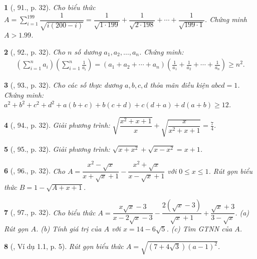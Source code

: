 \documentclass{article}
\newtheorem{baitoan}{}
\begin{document}
\begin{baitoan}[\cite{Tuyen_Toan_9_old}, 91., p. 32]
	Cho biểu thức $A = \sum_{i=1}^{199} \dfrac{1}{\sqrt{i(200 - i)}} = \dfrac{1}{\sqrt{1\cdot199}} + \dfrac{1}{\sqrt{2\cdot198}} + \cdots + \dfrac{1}{\sqrt{199\cdot1}}$. Chứng minh $A > 1.99$.
\end{baitoan}

\begin{baitoan}[\cite{Tuyen_Toan_9_old}, 92., p. 32]
	Cho $n$ số dương $a_1,a_2,\ldots,a_n$. Chứng minh:
	\begin{align*}
		\left(\sum_{i=1}^n a_i\right)\left(\sum_{i=1}^n \frac{1}{a_i}\right) = (a_1 + a_2 + \cdots + a_n)\left(\frac{1}{a_1} + \frac{1}{a_2} + \cdots + \frac{1}{a_n}\right)\ge n^2.
	\end{align*}
\end{baitoan}

\begin{baitoan}[\cite{Tuyen_Toan_9_old}, 93., p. 32]
	Cho các số thực dương $a,b,c,d$ thỏa mãn điều kiện $abcd = 1$. Chứng minh: $a^2 + b^2 + c^2 + d^2+ a(b + c) + b(c + d) + c(d + a) + d(a + b)\ge12$.
\end{baitoan}

\begin{baitoan}[\cite{Tuyen_Toan_9_old}, 94., p. 32]
	Giải phương trình: $\sqrt{\dfrac{x^2 + x + 1}{x}} + \sqrt{\dfrac{x}{x^2 + x + 1}} = \frac{7}{4}$.
\end{baitoan}

\begin{baitoan}[\cite{Tuyen_Toan_9_old}, 95., p. 32]
	Giải phương trình: $\sqrt{x + x^2} + \sqrt{x - x^2} = x + 1$.
\end{baitoan}

\begin{baitoan}[\cite{Tuyen_Toan_9_old}, 96., p. 32]
	Cho $A = \dfrac{x^2 - \sqrt{x}}{x + \sqrt{x} + 1} - \dfrac{x^2 + \sqrt{x}}{x - \sqrt{x} + 1}$ với $0\le x\le 1$. Rút gọn biểu thức $B = 1 - \sqrt{A + x + 1}$.
\end{baitoan}

\begin{baitoan}[\cite{Tuyen_Toan_9_old}, 97., p. 32]
	Cho biểu thức $A = \dfrac{x\sqrt{x} - 3}{x - 2\sqrt{x} - 3} - \dfrac{2(\sqrt{x} - 3)}{\sqrt{x} + 1} + \dfrac{\sqrt{x} + 3}{3 - \sqrt{x}}$. (a) Rút gọn $A$. (b) Tính giá trị của $A$ với $x = 14 - 6\sqrt{5}$. (c) Tìm {\rm GTNN} của $A$.
\end{baitoan}

\begin{baitoan}[\cite{TLCT_THCS_Toan_9_dai_so}, Ví dụ 1.1, p. 5]
	Rút gọn biểu thức $A = \sqrt{(7 + 4\sqrt{3})(a - 1)^2}$.
\end{baitoan}
\end{document}
